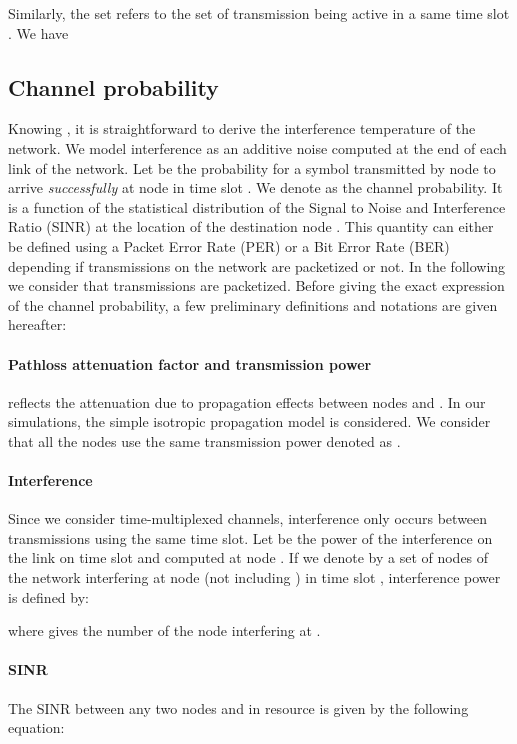 \documentclass[a4paper]{article}
\begin{document}
Similarly, the set  refers to the set of transmission being active in a same time slot . We have 

\subsection{Channel probability}
Knowing , it is straightforward to derive the interference temperature of the network. We model interference as an additive noise computed at the end of each link  of the network. 
Let  be the probability for a symbol transmitted by node  to arrive \emph{successfully} at node  in time slot . We denote  as the channel probability.
It is a function of the statistical distribution of the Signal to Noise and Interference Ratio (SINR) at the location of the destination node . 
This quantity can either be defined using a Packet Error Rate (PER) or a Bit Error Rate (BER) depending if transmissions on the network are packetized or not.  
In the following we consider that transmissions are packetized.
Before giving the exact expression of the channel probability, a few preliminary definitions and notations are given hereafter:

\paragraph*{Pathloss attenuation factor and transmission power}
 reflects the attenuation due to propagation effects between nodes  and . In our simulations, the simple isotropic propagation model is considered.
We consider that all the nodes use the same transmission power denoted as .



\paragraph*{Interference}
Since we consider time-multiplexed channels, interference only occurs between transmissions using the same time slot.
Let   be the power of the interference on the link  on time slot  and computed at node . 
If we denote by  a set of nodes of the network interfering at node  (not including ) in time slot , interference power is defined by:

\noindent where  gives the number of the node interfering at .
 
\paragraph*{SINR}
The SINR between any two nodes  and  in resource  is given by the following equation:
\end{document}
